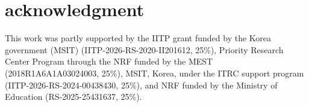 \documentclass[conference]{IEEEtran}
\begin{document}
\vspace{-0.2cm}
\section*{\textbf{acknowledgment}}
\fontsize{9}{3}\selectfont
This work was partly supported by the IITP grant funded by the Korea government (MSIT) (IITP-2026-RS-2020-II201612, 25\%), Priority Research Center Program through the NRF funded by the MEST (2018R1A6A1A03024003, 25\%), MSIT, Korea, under the ITRC support program (IITP-2026-RS-2024-00438430, 25\%), and NRF funded by the Ministry of Education (RS-2025-25431637, 25\%).
\balance
\vspace{-0.27cm}


\end{document}
